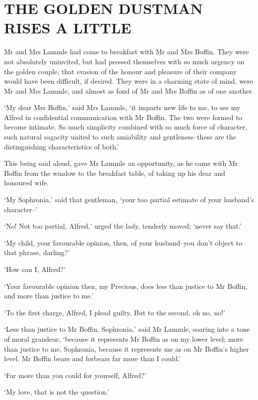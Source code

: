 
\chapter{THE GOLDEN DUSTMAN RISES A LITTLE}

Mr and Mrs Lammle had come to breakfast with Mr and Mrs Boffin. They
were not absolutely uninvited, but had pressed themselves with so much
urgency on the golden couple, that evasion of the honour and pleasure
of their company would have been difficult, if desired. They were in a
charming state of mind, were Mr and Mrs Lammle, and almost as fond of Mr
and Mrs Boffin as of one another.

‘My dear Mrs Boffin,’ said Mrs Lammle, ‘it imparts new life to me, to
see my Alfred in confidential communication with Mr Boffin. The two
were formed to become intimate. So much simplicity combined with so much
force of character, such natural sagacity united to such amiability and
gentleness--these are the distinguishing characteristics of both.’

This being said aloud, gave Mr Lammle an opportunity, as he came with Mr
Boffin from the window to the breakfast table, of taking up his dear and
honoured wife.

‘My Sophronia,’ said that gentleman, ‘your too partial estimate of your
husband’s character--’

‘No! Not too partial, Alfred,’ urged the lady, tenderly moved; ‘never
say that.’

‘My child, your favourable opinion, then, of your husband--you don’t
object to that phrase, darling?’

‘How can I, Alfred?’

‘Your favourable opinion then, my Precious, does less than justice to Mr
Boffin, and more than justice to me.’

‘To the first charge, Alfred, I plead guilty. But to the second, oh no,
no!’

‘Less than justice to Mr Boffin, Sophronia,’ said Mr Lammle, soaring
into a tone of moral grandeur, ‘because it represents Mr Boffin as on my
lower level; more than justice to me, Sophronia, because it represents
me as on Mr Boffin’s higher level. Mr Boffin bears and forbears far more
than I could.’

‘Far more than you could for yourself, Alfred?’

‘My love, that is not the question.’

